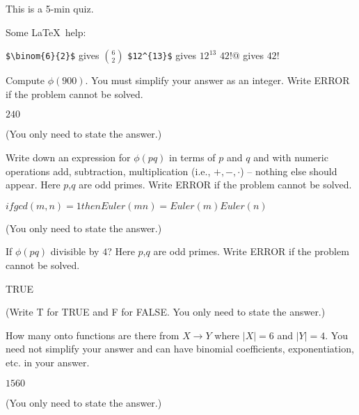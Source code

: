 

\renewcommand\AUTHOR{nweadick1@cougars.ccis.edu} %


\topmattertwo

This is a 5-min quiz.

Some \LaTeX\ help:
\begin{enumerate}[nosep]
\li \verb!$\binom{6}{2}$! gives $\binom{6}{2}$
\li \verb!$12^{13}$! gives $12^{13}$
\li \verb@$42!$@ gives $42!$
\end{enumerate}

\nextq
Compute $\phi(900)$. You must simplify your answer as an integer. 
Write ERROR if the problem cannot be solved.
\\
\ANSWER
\begin{answerlong}
$240$
\end{answerlong}
(You only need to state the answer.)

\nextq
Write down an expression for $\phi(pq)$ in terms of $p$ and $q$ and with
numeric operations add, subtraction, multiplication
(i.e., $+, -, \cdot$) -- nothing else should appear. 
Here $p$,$q$ are odd primes.
Write ERROR if the problem cannot be solved.
\\
\ANSWER
\begin{answerlong}
$ if gcd(m,n) = 1 then Euler(mn) = Euler(m)Euler(n)$
\end{answerlong}
(You only need to state the answer.)

\nextq
If $\phi(pq)$ divisible by $4$? 
Here $p$,$q$ are odd primes.
Write ERROR if the problem cannot be solved.
\\
\ANSWER
\begin{answerlong}
TRUE
\end{answerlong}
(Write T for TRUE and F for FALSE. You only need to state the answer.)

\nextq
How many onto functions are there from $X \rightarrow Y$ where
$|X| = 6$ and $|Y| = 4$.
You need not simplify your answer and can have binomial coefficients,
exponentiation, etc. in your answer.
\\
\ANSWER
\begin{answerlong}
$ 1560$
\end{answerlong}
(You only need to state the answer.)

\newpage


